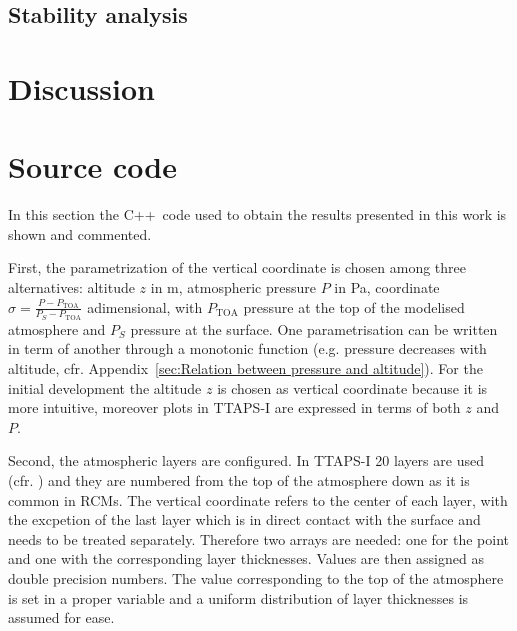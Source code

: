 \documentclass[a4paper,10pt,draft,twocolumn]{article}
\newcommand{\cpp}{C++}
\newcommand{\PTOA}{P_\mathrm{TOA}}
\begin{document}
\subsection{Stability analysis}

\section{Discussion}


\newpage
\appendix

\section{Source code}
In this section the \cpp\ code used to obtain the results presented in this work is shown and commented.

First, the parametrization of the vertical coordinate is chosen among three alternatives: altitude $z$ in \unit{\metre}, atmospheric pressure $P$ in \unit{\pascal}, coordinate $\sigma = \frac{P - \PTOA}{P_S - \PTOA}$ adimensional, with $\PTOA$ pressure at the top of the modelised atmosphere and $P_S$ pressure at the surface. One parametrisation can be written in term of another through a monotonic function (e.g. pressure decreases with altitude, cfr. Appendix~\ref{sec:Relation between pressure and altitude}). For the initial development the altitude $z$ is chosen as vertical coordinate because it is more intuitive, moreover plots in TTAPS-I are expressed in terms of both $z$ and $P$.

Second, the atmospheric layers are configured. In TTAPS-I 20 layers are used (cfr. \cite[396]{NuclearWinterPhysics}) and they are numbered from the top of the atmosphere down as it is common in RCMs. The vertical coordinate refers to the center of each layer, with the excpetion of the last layer which is in direct contact with the surface and needs to be treated separately. %
Therefore two arrays are needed: one for the point and one with the corresponding layer thicknesses. Values are then assigned as double precision numbers. The value corresponding to the top of the atmosphere is set in a proper variable and a uniform distribution of layer thicknesses is assumed for ease.
\end{document}
